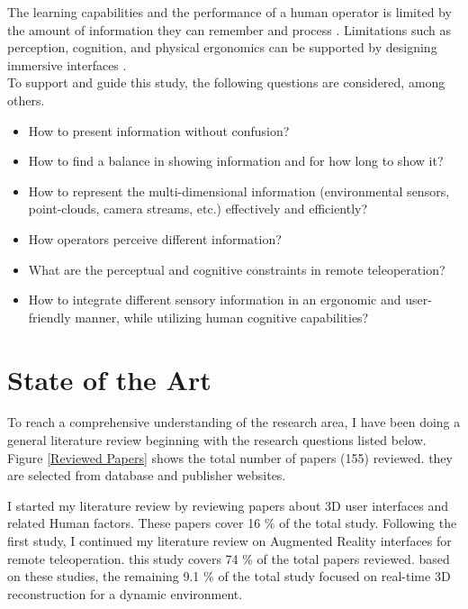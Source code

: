 The learning capabilities and the performance of a human operator is limited by the amount of information they can remember and process \cite{NAP25118}. Limitations such as perception, cognition, and physical ergonomics can be supported by designing immersive interfaces \cite{Bowman:2004:UIT:993837}.\\
To support and guide this study, the following questions are considered, among others.
\begin{itemize}
    \item How to present information without confusion?
    \item How to find a balance in showing information and for how long to show it?
    \item How to represent the multi-dimensional information (environmental sensors, point-clouds, camera streams, etc.) effectively and efficiently?
    \item How operators perceive different information?
    \item What are the perceptual and cognitive constraints in remote teleoperation?
    \item How to integrate different sensory information in an ergonomic and user-friendly manner, while utilizing human cognitive capabilities?
\end{itemize} 

\section{State of the Art}


To reach a comprehensive understanding of the research area, I have been doing a general literature review beginning with the research questions listed below. Figure \ref{Reviewed Papers} shows the total number of papers (155) reviewed. they are selected from database and publisher websites.

I started my literature review by reviewing papers about 3D user interfaces and related Human factors. These papers cover 16 $\%$ of the total study. Following the first study, I continued my literature review on  Augmented Reality interfaces for remote teleoperation. this study covers 74 $\%$ of the total papers reviewed.  based on these studies, the remaining 9.1 $\%$ of the total study focused on real-time 3D reconstruction for a dynamic environment.

